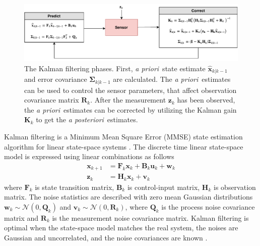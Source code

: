 \documentclass[english, 12pt, a4paper, elec, utf8, a-1b, online]{aaltothesis}
\renewcommand{\vec}[1]{\mathbf{#1}}
\newcommand{\xprior}{\hat{\vec{x}}_{k|k-1}}
\newcommand{\priorecov}{\boldsymbol{\Sigma}_{k|k-1}}
\newcommand{\x}{\vec{x}_k}
\newcommand{\xnext}{\vec{x}_{k+1}}
\newcommand{\z}{\vec{z}_k}
\newcommand{\stmodel}{\vec{F}_k}
\newcommand{\cimodel}{\vec{B}_k}
\newcommand{\cinput}{\vec{u}_k}
\newcommand{\pnoise}{\vec{w}_k}
\newcommand{\omodel}{\vec{H}_k}
\newcommand{\onoise}{\vec{v}_k}
\newcommand{\ocov}{\vec{R}_k}
\newcommand{\pcov}{\vec{Q}_k}
\newcommand{\gain}{\vec{K}_k}
\newcommand{\normal}[2]{\mathcal{N}\left(#1, #2 \right)}
\def\prior{\textit{a priori}\ }
\def\post{\textit{a posteriori}\ }
\begin{document}
\begin{figure}[b]
    \centering
    \includegraphics[width=\textwidth]{figures/KF.pdf}
    \caption{The Kalman filtering phases.
    First, \prior state estimate $\xprior$ and error covariance $\priorecov$ are calculated.
    The \prior estimates can be used to control the sensor parameters, that affect observation covariance matrix $\ocov$.
    After the measurement $\z$ has been observed, the \prior estimates can be corrected by utilizing the Kalman gain $\gain$ to get the \post estimates.
    }
    \label{fig:KF}
\end{figure}

Kalman filtering is a Minimum Mean Square Error (MMSE) state estimation algorithm for linear state-space systems \cite{Zarchan2000}.
The discrete time linear state-space model is expressed using linear combinations as follows \cite{Zarchan2000}
\begin{align}
    \xnext &= \stmodel \x + \cimodel \cinput + \pnoise \label{eq:lsp_state} \\
    \z &= \omodel \x + \onoise \label{eq:lsp_obs}
\end{align}
where $\stmodel$ is state transition matrix, $\cimodel$ is control-input matrix, $ \omodel $ is observation matrix. 
The noise statistics are described with zero mean Gaussian distributions $\pnoise \sim \normal{0}{\pcov}$ and $\onoise \sim \normal{0}{\ocov}$, where $\pcov$ is the process noise covariance matrix and $\ocov$ is the measurement noise covariance matrix.
Kalman filtering is optimal when the state-space model matches the real system, the noises are Gaussian and uncorrelated, and the noise covariances are known \cite{Krishnamurthy2016}.
\end{document}
